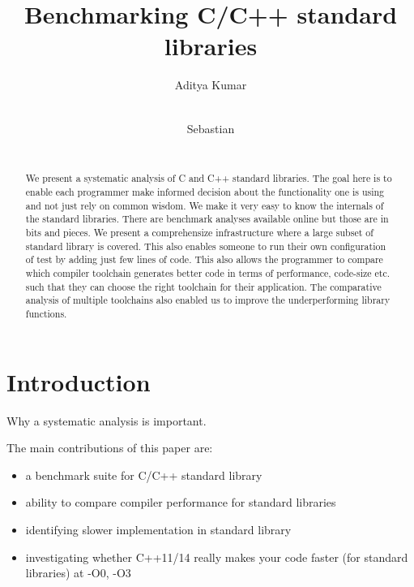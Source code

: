 \documentclass{sig-alternate}
\begin{document}
\def \GCC {GCC}
\def \LLVM {LLVM}

\setlength{\pdfpageheight}{\paperheight}
\setlength{\pdfpagewidth}{\paperwidth}

\title{Benchmarking C/C++ standard libraries}


\author{
\alignauthor
Aditya Kumar\\
       \\
\and
\alignauthor
Sebastian\\
       \\
}

\maketitle
\begin{abstract}
We present a systematic analysis of C and C++ standard libraries. The goal
here is to enable each programmer make informed decision about the functionality
one is using and not just rely on common wisdom. We make it very easy to know
the internals of the standard libraries. There are benchmark analyses available
online but those are in bits and pieces. We present a comprehensize infrastructure
where a large subset of standard library is covered. This also enables someone
to run their own configuration of test by adding just few lines of code. This also
allows the programmer to compare which compiler toolchain generates better code
in terms of performance, code-size etc. such that they can choose the right
toolchain for their application. The comparative analysis of multiple toolchains
also enabled us to improve the underperforming library functions.
\end{abstract}

\section{Introduction}
Why a systematic analysis is important.

The main contributions of this paper are:
\begin{itemize}
\item a benchmark suite for C/C++ standard library
\item ability to compare compiler performance for standard libraries
\item identifying slower implementation in standard library
\item investigating whether C++11/14 really makes your code faster (for
standard libraries) at -O0, -O3
\end{itemize}
\end{document}
